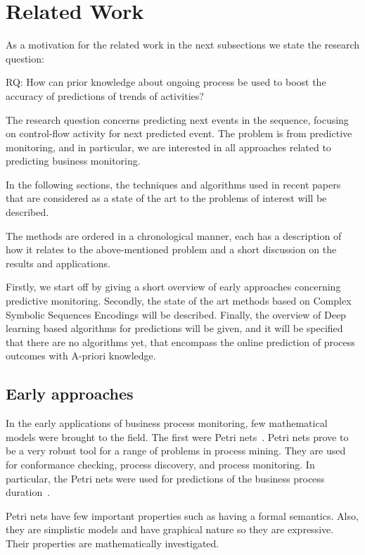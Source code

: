 \section{Related Work} %
\label{sec:related_work}

As a motivation for the related work in the next subsections we state the research question:

RQ: How can prior knowledge about ongoing process be used to boost the accuracy of predictions of trends of activities?

The research question concerns predicting next events in the sequence, focusing on control-flow activity for next predicted event. The problem is from predictive monitoring, and in particular, we are interested in all approaches related to predicting business monitoring. 

In the following sections, the techniques and algorithms used in recent papers that are considered as a state of the art to the problems of interest will be described.

The methods are ordered in a chronological manner, each has a description of how it relates to the above-mentioned problem and a short discussion on the results and applications.

Firstly, we start off by giving a short overview of early approaches concerning predictive monitoring.
Secondly, the state of the art methods based on Complex Symbolic Sequences Encodings will be described. 
Finally, the overview of Deep learning based algorithms for predictions will be given, and it will be specified that there are no algorithms yet, that encompass the online prediction of process outcomes with A-priori knowledge.



\subsection{Early approaches}

In the early applications of business process monitoring, few mathematical models were brought to the field. The first were Petri nets~\cite{doi:10.1142/S0218126698000043}. Petri nets prove to be a very robust tool for a range of problems in process mining. They are used for conformance checking, process discovery, and process monitoring. In particular, the Petri nets were used for predictions of the business process duration~\cite{Rogge-Solti2015PBP}. 

Petri nets have few important properties such as having a formal semantics. Also, they are simplistic models and have graphical nature so they are expressive. Their properties are mathematically investigated. 

